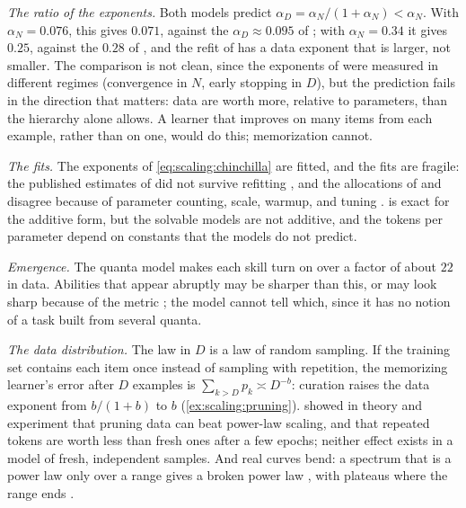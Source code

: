 \begin{refsection}
\emph{The ratio of the exponents.} Both models predict $\alpha_D=\alpha_N/(1+\alpha_N)<\alpha_N$. With $\alpha_N=0.076$, this gives $0.071$, against the $\alpha_D\approx0.095$ of \textcite{KaplanEtAl2020}; with $\alpha_N=0.34$ it gives $0.25$, against the $0.28$ of \textcite{HoffmannEtAl2022}, and the refit of \textcite{BesirogluEtAl2024} has a data exponent that is larger, not smaller. The comparison is not clean, since the exponents of \textcite{KaplanEtAl2020} were measured in different regimes (convergence in $N$, early stopping in $D$), but the prediction fails in the direction that matters: data are worth more, relative to parameters, than the hierarchy alone allows. A learner that improves on many items from each example, rather than on one, would do this; memorization cannot.

\emph{The fits.} The exponents of \eqref{eq:scaling:chinchilla} are fitted, and the fits are fragile: the published estimates of \textcite{HoffmannEtAl2022} did not survive refitting \parencite{BesirogluEtAl2024}, and the allocations of \textcite{KaplanEtAl2020} and \textcite{HoffmannEtAl2022} disagree because of parameter counting, scale, warmup, and tuning \parencite{PearceSong2024,PorianEtAl2024}.  is exact for the additive form, but the solvable models are not additive, and the tokens per parameter depend on constants that the models do not predict.

\emph{Emergence.} The quanta model makes each skill turn on over a factor of about $22$ in data. Abilities that appear abruptly \parencite{WeiEtAl2022} may be sharper than this, or may look sharp because of the metric \parencite{SchaefferEtAl2023}; the model cannot tell which, since it has no notion of a task built from several quanta.

\emph{The data distribution.} The law in $D$ is a law of random sampling. If the training set contains each item once instead of sampling with repetition, the memorizing learner's error after $D$ examples is $\sum_{k>D}p_k\asymp D^{-b}$: curation raises the data exponent from $b/(1+b)$ to $b$ (\cref{ex:scaling:pruning}). \Textcite{SorscherEtAl2022} showed in theory and experiment that pruning data can beat power-law scaling, and \textcite{MuennighoffEtAl2023} that repeated tokens are worth less than fresh ones after a few epochs; neither effect exists in a model of fresh, independent samples. And real curves bend: a spectrum that is a power law only over a range gives a broken power law \parencite{CaballeroEtAl2023}, with plateaus where the range ends \parencite{MaloneyEtAl2022}.


\end{refsection}
